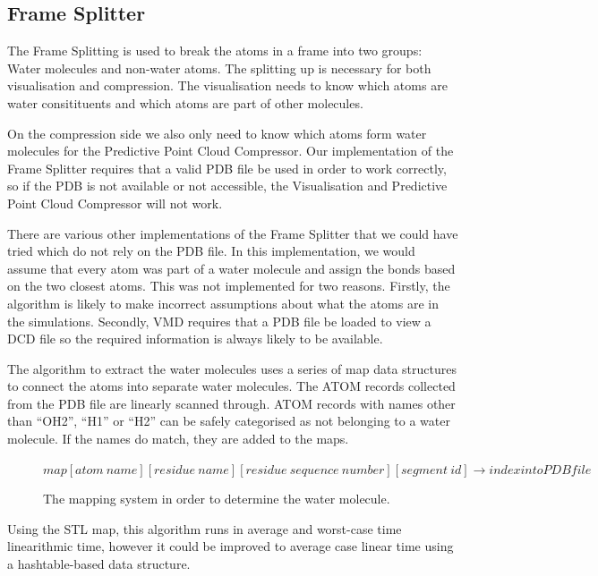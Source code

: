 \documentclass[a4paper,11pt]{report}
\begin{document}
\subsection{Frame Splitter}

The Frame Splitting is used to break the atoms in a frame into two groups: Water molecules and non-water atoms. The splitting up is necessary for both visualisation and compression. The visualisation needs to know which atoms are water consitituents and which atoms are part of other molecules. 

On the compression side we also only need to  know which atoms form water molecules for the Predictive Point Cloud Compressor. Our implementation of the Frame Splitter requires that a valid PDB file be used in order to work correctly, so if the PDB is not available or not accessible, the Visualisation and Predictive Point Cloud Compressor will not work. 

There are various other implementations of the Frame Splitter that we could have tried which do not rely on the PDB file. In this implementation, we would assume that every atom was part of a water molecule and assign the bonds based on the two closest atoms. This was not implemented for two reasons. Firstly, the algorithm is likely to make incorrect assumptions about what the atoms are in the simulations. Secondly, VMD requires that a PDB file be loaded to view a DCD file so the required information is always likely to be available.

The algorithm to extract the water molecules uses a series of map data structures to connect the atoms into separate water molecules. The ATOM records collected from the PDB file are linearly scanned through. ATOM records with names other than ``OH2'', ``H1'' or ``H2'' can be safely categorised as not belonging to a water molecule. If the names do match, they are added to the maps.

\begin{figure}[!h]
\begin{center}
 \small
 $map[atom\ name][residue\ name][residue\ sequence\ number][segment\ id] \rightarrow index into PDB file$
 \caption{The mapping system in order to determine the water molecule.}
\end{center} 
\end{figure}

Using the STL map, this algorithm runs in average and worst-case time linearithmic time, however it could be improved to average case linear time using a hashtable-based data structure.
\end{document}
